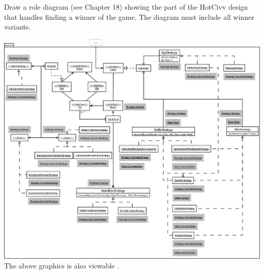 Draw a role diagram (see Chapter 18) showing the part of the HotCivv design that
handles finding a winner of the game. The diagram must include all winner
variants.

\includegraphics[width=\textwidth]{../../UML_u4}
The above graphics is also viewable \href{http://cs.au.dk/~skeen/}{\bf
{}}.
